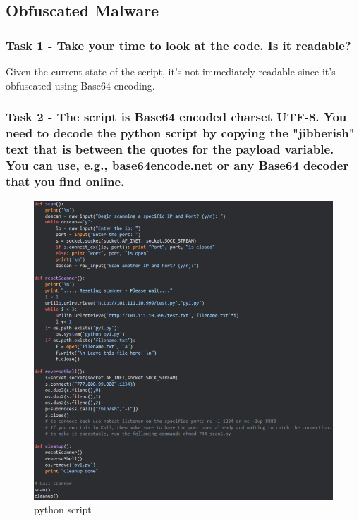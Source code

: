 \subsection{Obfuscated Malware}

\subsubsection{Task 1 - Take your time to look at the code. Is it readable?}
Given the current state of the script, it's not immediately readable since it's obfuscated using
Base64 encoding.

\subsubsection{Task 2 - The script is Base64 encoded charset UTF-8. You need to decode the
      python script by copying the "jibberish" text that is between the quotes for the
      payload variable. You can use, e.g., base64encode.net or any Base64 decoder
      that you find online.}

\begin{figure}[H]
      \centering
      \includegraphics[width=0.9\linewidth]{pic/python script.png}
      \caption{python script}
      \label{fig:python script}
\end{figure}


